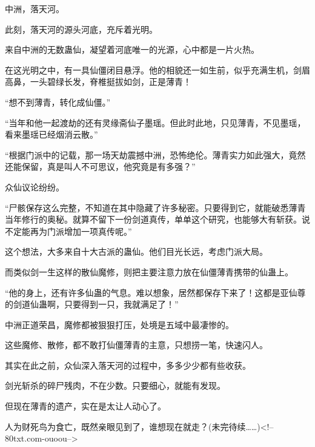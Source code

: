 \begin{this_body}
中洲，落天河。

此刻，落天河的源头河底，充斥着光明。

来自中洲的无数蛊仙，凝望着河底唯一的光源，心中都是一片火热。

在这光明之中，有一具仙僵闭目悬浮。他的相貌还一如生前，似乎充满生机，剑眉高鼻，一头碧绿长发，脊椎挺拔如剑，正是薄青！

“想不到薄青，转化成仙僵。”

“当年和他一起渡劫的还有灵缘斋仙子墨瑶。但此时此地，只见薄青，不见墨瑶，看来墨瑶已经烟消云散。”

“根据门派中的记载，那一场天劫震撼中洲，恐怖绝伦。薄青实力如此强大，竟然还能保留，真是叫人不可思议，他究竟是有多强？”

众仙议论纷纷。

“尸骸保存这么完整，不知道在其中隐藏了许多秘密。只要得到它，就能破悉薄青当年修行的奥秘。就算不留下一份剑道真传，单单这个研究，也能够大有斩获。说不定能再为门派增加一项真传呢。”

这个想法，大多来自十大古派的蛊仙。他们目光长远，考虑门派大局。

而类似剑一生这样的散仙魔修，则把主要注意力放在仙僵薄青携带的仙蛊上。

“他的身上，还有许多仙蛊的气息。难以想象，居然都保存下来了！这都是亚仙尊的剑道仙蛊啊，只要得到一只，我就满足了！”

中洲正道荣昌，魔修都被狠狠打压，处境是五域中最凄惨的。

这些魔修、散修，都不敢打仙僵薄青的主意，只想捞一笔，快速闪人。

其实在此之前，众仙深入落天河的过程中，多多少少都有些收获。

剑光斩杀的碎尸残肉，不在少数。只要细心，就能有发现。

但现在薄青的遗产，实在是太让人动心了。

人为财死鸟为食亡，既然亲眼见到了，谁想现在就走？(未完待续……)<!--80txt.com-ouoou-->

\end{this_body}

